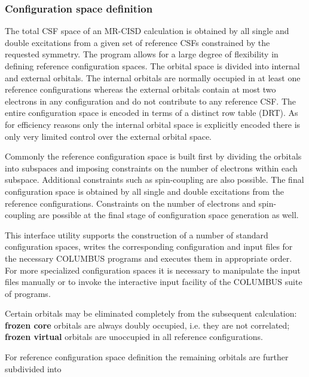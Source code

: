\subsubsection{Configuration space definition}

The total CSF space of an MR-CISD calculation 
is obtained by all single and double 
excitations from a given set of reference CSFs constrained 
by the requested symmetry.  The  program allows
for a large degree of flexibility in defining reference configuration spaces. 
The orbital space is divided into internal and external orbitals. The
internal orbitals are normally occupied in at least one reference 
configurations whereas the external orbitals contain at most two
electrons in any configuration and do not contribute to any reference CSF. 
The entire configuration space is 
encoded in terms of a distinct row table (DRT). As for efficiency 
reasons only the internal orbital space is explicitly encoded there
is only very limited control over the external orbital space. 

Commonly the reference configuration space is built first by
dividing the orbitals into subspaces and imposing constraints
on the number of electrons within each subspace. Additional 
constraints such as spin-coupling are also possible. The final
configuration space is obtained by all single and double excitations
from the reference configurations. Constraints on the number of 
electrons and spin-coupling are possible at the final stage of
configuration space generation as well. 

This interface utility supports the construction of a number of
standard configuration spaces, writes the corresponding configuration
and input files for the necessary COLUMBUS programs and executes them
in appropriate order. For more specialized configuration spaces 
it is necessary to manipulate the input files manually or to invoke
the interactive input facility of the COLUMBUS suite of programs.

Certain orbitals may be eliminated completely from the subsequent calculation:
{\bf frozen core} orbitals are always doubly occupied, i.e. they are
not correlated; {\bf frozen virtual} orbitals are unoccupied in all reference
configurations. 

For reference configuration space definition 
the remaining orbitals are further subdivided into 

